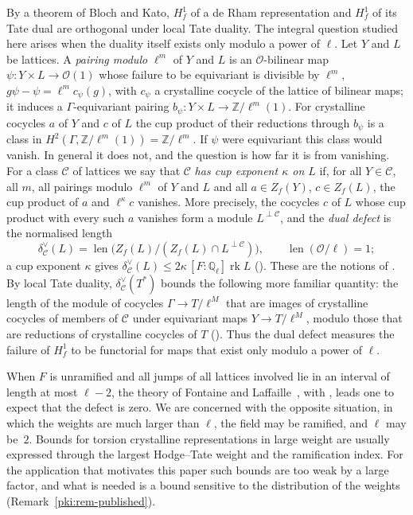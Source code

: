 \documentclass[10pt]{amsart}
\theoremstyle{definition}
\theoremstyle{remark}
\begin{document}
By a theorem of Bloch and Kato, $H^1_f$ of a de Rham representation and $H^1_f$ of its Tate dual
are orthogonal under local Tate duality. The integral question studied here arises when the
duality itself exists only modulo a power of $\ell$. Let $Y$ and $L$ be lattices. A
\emph{pairing modulo $\ell^m$} of $Y$ and $L$ is an $\mathcal O$-bilinear map
$\psi\colon Y\times L\to\mathcal O(1)$ whose failure to be equivariant is divisible by $\ell^m$,
$g\psi-\psi=\ell^m c_\psi(g)$, with $c_\psi$ a crystalline cocycle of the lattice of bilinear
maps; it induces a $\Gamma$-equivariant pairing $b_\psi\colon Y\times L\to\mathbb Z/\ell^m(1)$.
For crystalline cocycles $a$ of $Y$ and $c$ of $L$ the cup product of their reductions through
$b_\psi$ is a class in $H^2(\Gamma,\mathbb Z/\ell^m(1))=\mathbb Z/\ell^m$. If $\psi$ were
equivariant this class would vanish. In general it does not, and the question is how far it is
from vanishing. For a class $\mathcal C$ of lattices we say that $\mathcal C$ \emph{has cup
exponent $\kappa$ on $L$} if, for all $Y\in\mathcal C$, all $m$, all pairings modulo $\ell^m$ of $Y$
and $L$ and all $a\in Z_f(Y)$, $c\in Z_f(L)$, the cup product of $a$ and $\ell^\kappa c$
vanishes. More precisely, the cocycles $c$ of $L$ whose cup product with every such $a$ vanishes
form a module $L^{\perp\mathcal C}$, and the \emph{dual defect} is the normalised length
\[
\delta^\vee_{\mathcal C}(L)=\operatorname{len}\bigl(Z_f(L)/(Z_f(L)\cap L^{\perp\mathcal C})\bigr),
\qquad\operatorname{len}(\mathcal O/\ell)=1 ;
\]
a cup exponent $\kappa$ gives $\delta^\vee_{\mathcal C}(L)\le2\kappa\,[F:\mathbb Q_\ell]\operatorname{rk}L$
({\cite[Lemma~5.6]{P55}}). These are the notions of {\cite[Definition~5.1]{P55}}.
By local Tate duality, $\delta^\vee_{\mathcal C}(T^*)$ bounds the following more familiar
quantity: the length of the module of cocycles $\Gamma\to T/\ell^M$ that are images of
crystalline cocycles of members of $\mathcal C$ under equivariant maps $Y\to T/\ell^M$, modulo
those that are reductions of crystalline cocycles of $T$ ({\cite[Proposition~5.4]{P55}}). Thus the dual defect
measures the failure of $H^1_f$ to be functorial for maps that exist only modulo a power of
$\ell$.

When $F$ is unramified and all jumps of all lattices involved lie in an interval of length at
most $\ell-2$, the theory of Fontaine and Laffaille~\cite{FontaineLaffaille}, with
\cite[\S4]{BlochKato}, leads one to expect that the defect is zero. We are concerned with the
opposite situation, in which the weights are much larger than $\ell$, the field may be ramified,
and $\ell$ may be~$2$. Bounds for torsion crystalline representations in large weight are
usually expressed through the largest Hodge--Tate weight and the ramification index. For the
application that motivates this paper such bounds are too weak by a large factor, and what is
needed is a bound sensitive to the distribution of the weights
(Remark~\ref{pki:rem-published}).
\end{document}
